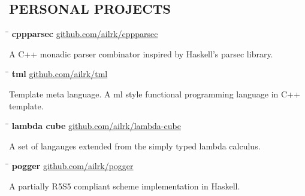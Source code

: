 \documentclass{res}
\begin{document}
\begin{resume}
\vspace{-0.2in}
\section{PERSONAL PROJECTS}

    \vspace{-0.1in}
    \begin{tabbing}
        \hspace{2.4in}\= \hspace{0.9in}\= \kill
        {\bf cppparsec } \>               \>\url{github.com/ailrk/cppparsec}\\

    \end{tabbing}\vspace{-30pt}
    A C++ monadic parser combinator inspired by Haskell's parsec library.

    \vspace{-0.2in}
    \begin{tabbing}
        \hspace{2.4in}\= \hspace{0.9in}\= \kill
        {\bf tml} \>               \>\url{github.com/ailrk/tml}\\

    \end{tabbing}\vspace{-30pt}
    Template meta language. A ml style functional programming language in C++ template.

    \vspace{-0.2in}
    \begin{tabbing}
        \hspace{2.4in}\= \hspace{0.9in}\= \kill
        {\bf lambda cube} \>               \>\url{github.com/ailrk/lambda-cube}\\

    \end{tabbing}\vspace{-30pt}
    A set of langauges extended from the simply typed lambda calculus.

    \vspace{-0.2in}
    \begin{tabbing}
        \hspace{2.4in}\= \hspace{0.9in}\= \kill
        {\bf pogger } \>               \>\url{github.com/ailrk/pogger}\\

    \end{tabbing}\vspace{-30pt}
    A partially R5S5 compliant scheme implementation in Haskell.


\end{resume}
\end{document}
